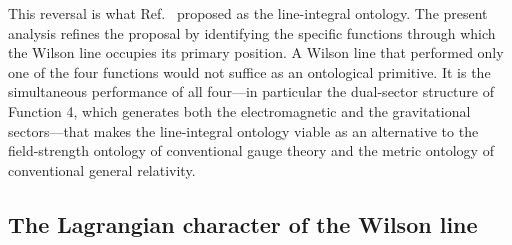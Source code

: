 \documentclass[%
 reprint, amsmath,amssymb, aps, prb, ]{revtex4-2}
\numberwithin{equation}{section}
\begin{document}
This reversal is what Ref.~\cite{hanamura31} proposed as the line-integral ontology. The present analysis refines the proposal by identifying the specific functions through which the Wilson line occupies its primary position. A Wilson line that performed only one of the four functions would not suffice as an ontological primitive. It is the simultaneous performance of all four---in particular the dual-sector structure of Function 4, which generates both the electromagnetic and the gravitational sectors---that makes the line-integral ontology viable as an alternative to the field-strength ontology of conventional gauge theory and the metric ontology of conventional general relativity.

\subsection{The Lagrangian character of the Wilson line}
\label{sec:lagrangian}
\end{document}
